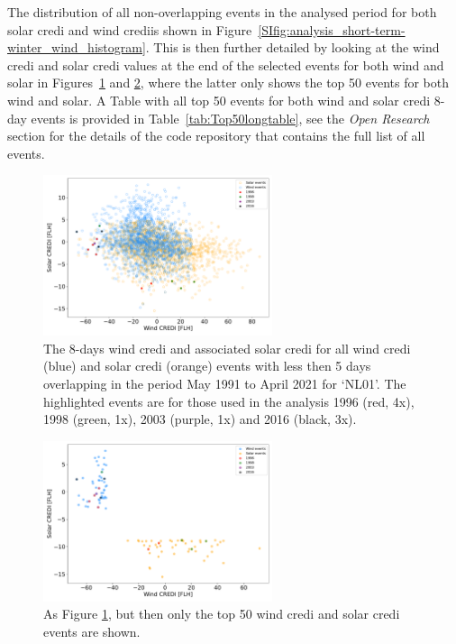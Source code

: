 \documentclass[12pt]{iopart}
\newcommand{\sdi}[0]{{\sc solar credi}}
\newcommand{\wdi}[0]{{\sc wind credi}}
\begin{document}
The distribution of all non-overlapping events in the analysed period for both \sdi{} and \wdi is shown in Figure~\ref{SIfig:analysis_short-term-winter_wind_histogram}.
This is then further detailed by looking at the \wdi{} and \sdi{} values at the end of the selected events for both wind and solar in Figures~\ref{SIfig:analysis_short-term-winter_wind_scatter} and \ref{SIfig:analysis_short-term-winter_wind_scatter_top50}, where the latter only shows the top 50 events for both wind and solar.
A Table with all top 50 events for both {\sc wind} and \sdi{} 8-day events is provided in Table~\ref{tab:Top50longtable}, see the \emph{Open Research} section for the details of the code repository that contains the full list of all events.

\begin{figure}[h]
        \centering
        \includegraphics[width=0.6\textwidth]{Figures_SI/WindCREDI_shortterm_scatter}
        \caption{
                The 8-days \wdi{} and associated \sdi{} for all \wdi{} (blue) and \sdi{} (orange) events with less then 5 days overlapping in the period May 1991 to April 2021 for `NL01'. 
                The highlighted events are for those used in the analysis 1996 (red, 4x), 1998 (green, 1x), 2003 (purple, 1x) and 2016 (black, 3x). 
        }
        \label{SIfig:analysis_short-term-winter_wind_scatter}
\end{figure}
\begin{figure}[h]
        \centering
        \includegraphics[width=0.6\textwidth]{Figures_SI/WindCREDI_shortterm_scatter_top50}
        \caption{
                As Figure \ref{SIfig:analysis_short-term-winter_wind_scatter}, but then only the top 50 \wdi{} and \sdi{} events are shown. 
        }
        \label{SIfig:analysis_short-term-winter_wind_scatter_top50}
\end{figure}
\end{document}
